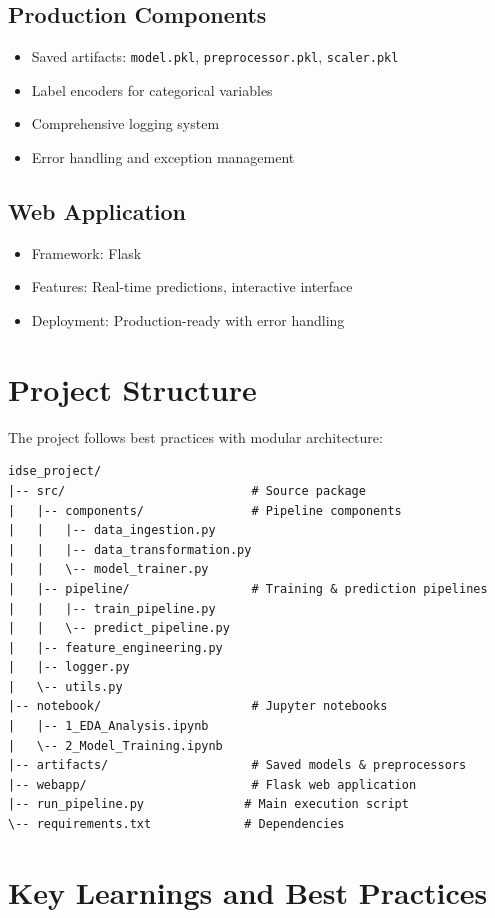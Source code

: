 \documentclass[12pt,a4paper]{article}
\begin{document}
\subsection{Production Components}
\begin{itemize}
    \item Saved artifacts: \texttt{model.pkl}, \texttt{preprocessor.pkl}, \texttt{scaler.pkl}
    \item Label encoders for categorical variables
    \item Comprehensive logging system
    \item Error handling and exception management
\end{itemize}

\subsection{Web Application}
\begin{itemize}
    \item Framework: Flask
    \item Features: Real-time predictions, interactive interface
    \item Deployment: Production-ready with error handling
\end{itemize}

\section{Project Structure}

The project follows best practices with modular architecture:

\begin{verbatim}
idse_project/
|-- src/                          # Source package
|   |-- components/               # Pipeline components
|   |   |-- data_ingestion.py
|   |   |-- data_transformation.py
|   |   \-- model_trainer.py
|   |-- pipeline/                 # Training & prediction pipelines
|   |   |-- train_pipeline.py
|   |   \-- predict_pipeline.py
|   |-- feature_engineering.py
|   |-- logger.py
|   \-- utils.py
|-- notebook/                     # Jupyter notebooks
|   |-- 1_EDA_Analysis.ipynb
|   \-- 2_Model_Training.ipynb
|-- artifacts/                    # Saved models & preprocessors
|-- webapp/                       # Flask web application
|-- run_pipeline.py              # Main execution script
\-- requirements.txt             # Dependencies
\end{verbatim}

\section{Key Learnings and Best Practices}
\end{document}
